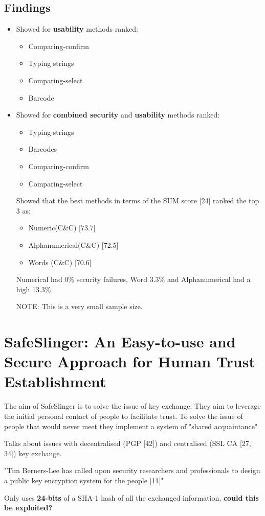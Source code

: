 \subsection{Findings}
\begin{itemize}
    \item Showed for \textbf{usability} methods ranked:
    \begin{itemize}
        \item Comparing-confirm
        \item Typing strings
        \item Comparing-select
        \item Barcode
    \end{itemize}

    \item Showed for \textbf{combined security} and \textbf{usability} methods ranked:
    \begin{itemize}
        \item Typing strings
        \item Barcodes
        \item Comparing-confirm
        \item Comparing-select
    \end{itemize}

    Showed that the best methods in terms of the SUM score [24] ranked the top 3 as:
    \begin{itemize}
        \item Numeric(C\&C)          [73.7]
        \item Alphanumerical(C\&C)   [72.5]
        \item Words (C\&C)           [70.6]
    \end{itemize}

    Numerical had 0\% security failures, Word 3.3\% and Alphanumerical had a high 13.3\% 

    NOTE: This is a very small sample size.
\end{itemize}

\newpage

\section{SafeSlinger: An Easy-to-use and Secure Approach for
Human Trust Establishment}

The aim of SafeSlinger is to solve the issue of key exchange. They aim to leverage the initial personal contact of people to facilitate trust. To solve the issue of people that would never meet they implement a system of "shared acquaintance"

Talks about issues with decentralised (PGP [42]) and centralised (SSL CA [27, 34]) key exchange.

"Tim Berners-Lee has called upon security researchers and professionals to design a public key encryption system for the people [11]"

Only uses \textbf{24-bits} of a SHA-1 hash of all the exchanged information, \textbf{could this be exploited?}